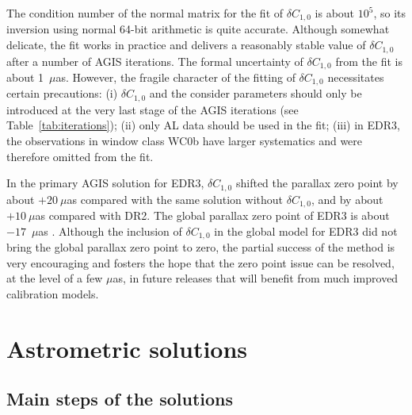 \documentclass[longauth]{aa} %
\begin{document}
The condition number of the normal matrix for the fit of $\delta C_{1,0}$ 
is about $10^5$, so its inversion using normal 64-bit arithmetic is 
quite accurate. Although somewhat delicate, the fit works in practice and 
delivers a reasonably stable value of $\delta C_{1,0}$ after a number of 
AGIS iterations. The formal uncertainty of $\delta C_{1,0}$ from the fit 
is about 1~$\mu$as.
However, the fragile character of the fitting of $\delta C_{1,0}$ necessitates 
certain precautions: (i) $\delta C_{1,0}$ and the consider parameters 
should only be introduced at the very last stage of the AGIS iterations 
(see Table~\ref{tab:iterations}); (ii) only AL data should be used in the fit; 
(iii) in EDR3, the observations in window class WC0b have larger systematics
and were therefore omitted from the fit. 

In the primary AGIS solution for EDR3, $\delta C_{1,0}$ shifted the parallax zero 
point by about $+20~\mu$as compared with the same solution without $\delta C_{1,0}$, 
and by about $+10~\mu$as compared with DR2. The global parallax zero point of 
EDR3 is about $-17$~$\mu$as \citep{EDR3-DPACP-132}.
Although the inclusion of $\delta C_{1,0}$ in the global model for EDR3 did not bring
the global parallax zero point to zero, the partial success of the method is very 
encouraging and fosters the hope that the zero point issue can be resolved, at the level
of a few $\mu$as, in future releases that will benefit from much improved calibration models.


\section{Astrometric solutions}
\label{sec:agis}

\subsection{Main steps of the solutions}
\label{sec:steps}
\end{document}
